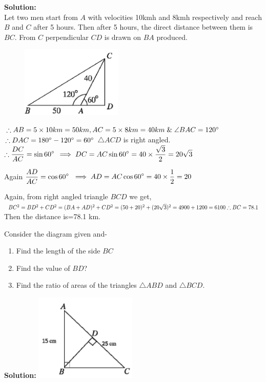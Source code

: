 \textbf{Solution:\\}Let two men start from $A$ with velocities 10kmh and 8kmh respectively and reach $B$ and $C$ after 5 hours. Then after 5 hours, the direct distance between them is $BC$. From $C$ perpendicular $CD$ is drawn on $BA$ produced.\\
\begin{figure}
	\includegraphics[width=1.9in]{pics/e3}
\end{figure}
$\therefore AB=5\times 10km=50km, \\AC=5\times 8km = 40 km \;\& \;\angle BAC=120\degree\\$
$\therefore DAC=180 \degree-120\degree=60\degree\\$
$\triangle ACD$ is right angled.\\
$\therefore \displaystyle \frac{DC}{AC}=\sin 60\degree\\$
$\implies \displaystyle DC=AC\sin 60\degree\\= 40\times \frac{\sqrt{3}}{2}=20\sqrt{3}\\$


Again $ \displaystyle \frac{AD}{AC}=\cos 60\degree\\$
$\implies \displaystyle AD=AC\cos 60\degree= 40\times \frac{1}{2}=20\\$

Again, from right angled triangle $BCD$ we get,\\
$BC^2=BD^2+CD^2=(BA+AD)^2+CD^2\\=(50+20)^2+(20\sqrt{3})^2=4900+1200=6100\\[1ex]\therefore BC=78.1\\$
Then the distance is=78.1 km.

\begin{exmp}
	Consider the diagram given and-
	\begin{enumerate}
		\item Find the length of the side $BC$
		\item Find the value of $BD$?
		\item Find the ratio of areas of the triangles $\triangle ABD$ and $\triangle BCD$.
	\end{enumerate}
\end{exmp}
\textbf{Solution:}
	\includegraphics[width=1.9in]{pics/e4}

